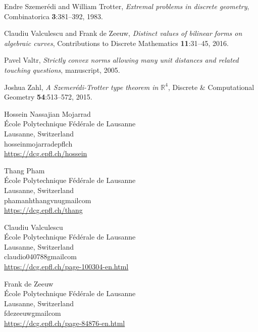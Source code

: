 \documentclass{daj}
\theoremstyle{definition}
\newcommand{\R}{\mathbb R}
\begin{document}
\begin{thebibliography}{99}
Endre Szemer\'{e}di and William Trotter,
\emph{Extremal problems in discrete geometry},
Combinatorica {\bf 3}:381--392, 1983.

Claudiu Valculescu and Frank de Zeeuw,
\emph{Distinct values of bilinear forms on algebraic curves},
Contributions to Discrete Mathematics {\bf 11}:31--45, 2016.

Pavel Valtr,
\emph{Strictly  convex  norms  allowing  many
unit  distances  and  related  touching  questions},
manuscript, 2005.

Joshua Zahl,
\emph{A Szemer\'edi-Trotter type theorem in $\R^4$},
Discrete \& Computational Geometry {\bf 54}:513--572, 2015.

\end{thebibliography}


\begin{dajauthors}
\begin{authorinfo}[hnm]
  Hossein Nassajian Mojarrad\\
  \'Ecole Polytechnique F\'ed\'erale de Lausanne\\
  Lausanne, Switzerland\\
  hossein\imagedot{}mojarrad\imageat{}epfl\imagedot{}ch \\
  \url{https://dcg.epfl.ch/hossein}
\end{authorinfo}
\begin{authorinfo}[tp]
  Thang Pham\\
  \'Ecole Polytechnique F\'ed\'erale de Lausanne\\
  Lausanne, Switzerland\\
  phamanhthang\imagedot{}vnu\imageat{}gmail\imagedot{}com \\
  \url{https://dcg.epfl.ch/thang}
\end{authorinfo}
\begin{authorinfo}[laci]
  Claudiu Valculescu\\
  \'Ecole Polytechnique F\'ed\'erale de Lausanne\\
  Lausanne, Switzerland\\
  claudio040788\imageat{}gmail\imagedot{}com \\
  \url{https://dcg.epfl.ch/page-100304-en.html}
\end{authorinfo}
\begin{authorinfo}[andy]
  Frank de Zeeuw\\
  \'Ecole Polytechnique F\'ed\'erale de Lausanne\\
  Lausanne, Switzerland\\
  fdezeeuw\imageat{}gmail\imagedot{}com\\
  \url{https://dcg.epfl.ch/page-84876-en.html}
\end{authorinfo}
\end{dajauthors}
\end{document}
